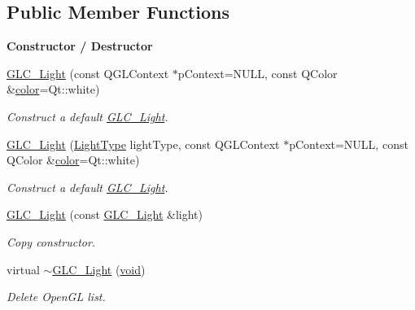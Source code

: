 \subsection*{Public Member Functions}
\begin{Indent}{\bf Constructor / Destructor}\par
\begin{DoxyCompactItemize}
\item 
\hyperlink{class_g_l_c___light_a945d23623d4a2d2978e94ed246459ffd}{G\-L\-C\-\_\-\-Light} (const Q\-G\-L\-Context $\ast$p\-Context=N\-U\-L\-L, const Q\-Color \&\hyperlink{glext_8h_a3ea846f998d64f079b86052b6c4193a8}{color}=Qt\-::white)
\begin{DoxyCompactList}\small\item\em Construct a default \hyperlink{class_g_l_c___light}{G\-L\-C\-\_\-\-Light}. \end{DoxyCompactList}\item 
\hyperlink{class_g_l_c___light_a2ef8266f4144857ef7b2205c43157fd5}{G\-L\-C\-\_\-\-Light} (\hyperlink{class_g_l_c___light_a3b07c40e07008c58c5da29ccabfef6a6}{Light\-Type} light\-Type, const Q\-G\-L\-Context $\ast$p\-Context=N\-U\-L\-L, const Q\-Color \&\hyperlink{glext_8h_a3ea846f998d64f079b86052b6c4193a8}{color}=Qt\-::white)
\begin{DoxyCompactList}\small\item\em Construct a default \hyperlink{class_g_l_c___light}{G\-L\-C\-\_\-\-Light}. \end{DoxyCompactList}\item 
\hyperlink{class_g_l_c___light_ae530d8f9d907a53637ccfbd909b3f697}{G\-L\-C\-\_\-\-Light} (const \hyperlink{class_g_l_c___light}{G\-L\-C\-\_\-\-Light} \&light)
\begin{DoxyCompactList}\small\item\em Copy constructor. \end{DoxyCompactList}\item 
virtual \hyperlink{class_g_l_c___light_aed91410bddc9bda631b0a64309de1d65}{$\sim$\-G\-L\-C\-\_\-\-Light} (\hyperlink{group___u_a_v_objects_plugin_ga444cf2ff3f0ecbe028adce838d373f5c}{void})
\begin{DoxyCompactList}\small\item\em Delete Open\-G\-L list. \end{DoxyCompactList}\end{DoxyCompactItemize}
\end{Indent}
